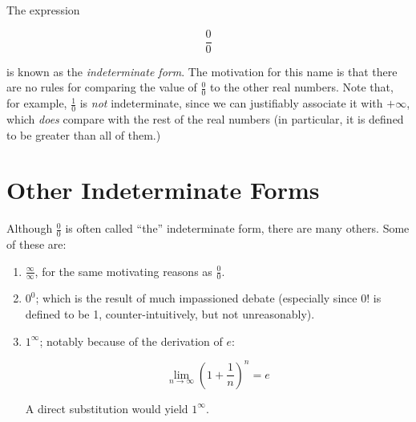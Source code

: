 \documentclass[12pt]{article}
\begin{document}
The expression

$$ \frac{0}{0} $$

is known as the \emph{indeterminate form}.  The motivation for this name is that there are no rules for comparing the value of $\frac{0}{0}$ to the other real numbers.  Note that, for example, $\frac{1}{0}$ is \emph{not} indeterminate, since we can justifiably associate it with $+\infty$, which \emph{does} compare with the rest of the real numbers (in particular, it is defined to be greater than all of them.)

\section{Other Indeterminate Forms}

Although $\frac{0}{0}$ is often called ``the'' indeterminate form, there are many others.  Some of these are:

\begin{enumerate} 

\item $ \frac{\infty}{\infty} $, for the same motivating reasons as $\frac{0}{0}$.

\item $ 0^0 $; which is the result of much impassioned debate (especially since $0!$ is defined to be 1, counter-intuitively, but not unreasonably).

\item $1^{\infty}$; notably because of the derivation of $e$: 

$$ \lim_{n \to \infty} \left( 1+\frac{1}{n} \right)^n = e $$

A direct substitution would yield $1^\infty$.

\end{enumerate}
\end{document}
